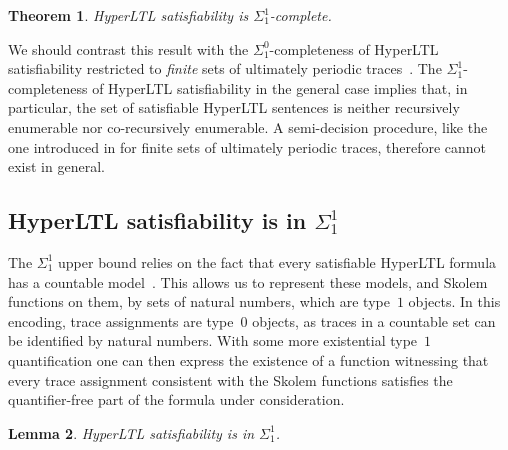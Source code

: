 \documentclass[dvipsnames,10pt,a4paper]{amsart}
\newtheorem{thm}{Theorem}[section]
\newtheorem{lem}[thm]{Lemma}
\theoremstyle{definition}
\theoremstyle{remark}
\newcommand{\hyltl}{{HyperLTL}\xspace}
\begin{document}
\begin{thm}\label{thm:hyltl-sat}
  \hyltl satisfiability is $\Sigma^1_1$-complete.
\end{thm}


We should contrast this result with the $\Sigma^0_1$-completeness of
\hyltl satisfiability restricted to
\emph{finite} sets of ultimately periodic traces~\cite[Theorem 1]{FHH18}. The $\Sigma^1_1$-completeness
of \hyltl satisfiability in the general case implies that, in particular, the set of
satisfiable \hyltl sentences is neither recursively enumerable nor co-recursively
enumerable. A semi-decision procedure, like the one introduced in \cite{FHH18}
for finite sets of ultimately periodic traces, therefore cannot exist in general.


\subsection{\texorpdfstring{\hyltl}{HyperLTL} satisfiability is in \texorpdfstring{$\Sigma_1^1$}{Sigma11}}
The $\Sigma^1_1$ upper bound relies on the fact that every satisfiable \hyltl
formula has a countable model~\cite{FZ17}. 
This allows us to represent these models, and Skolem functions on them, by sets of natural numbers, which are 
type~$1$ objects. In this encoding, trace assignments are type~$0$ objects, as traces in a countable set can be identified by natural numbers. With some more existential type~$1$ quantification one can then express the existence of a function witnessing that every trace assignment consistent with the Skolem functions satisfies the quantifier-free part of the formula under consideration. 

\begin{lem}
\label{lemma:hyltl_membership}
\hyltl satisfiability is in $\Sigma_1^1$.	
\end{lem}
\end{document}

